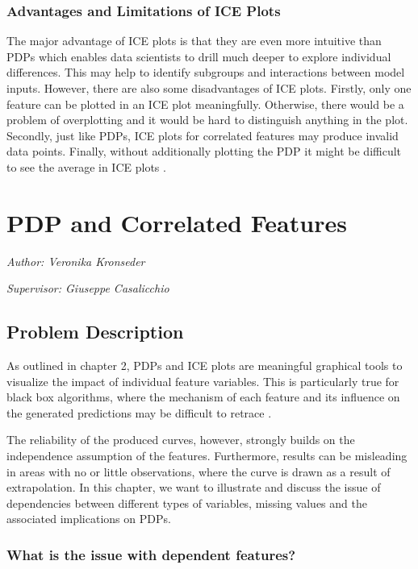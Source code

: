 \documentclass[]{krantz}
\begin{document}
\subsection{Advantages and Limitations of ICE
Plots}\label{advantages-and-limitations-of-ice-plots}

The major advantage of ICE plots is that they are even more intuitive
than PDPs which enables data scientists to drill much deeper to explore
individual differences. This may help to identify subgroups and
interactions between model inputs. However, there are also some
disadvantages of ICE plots. Firstly, only one feature can be plotted in
an ICE plot meaningfully. Otherwise, there would be a problem of
overplotting and it would be hard to distinguish anything in the plot.
Secondly, just like PDPs, ICE plots for correlated features may produce
invalid data points. Finally, without additionally plotting the PDP it
might be difficult to see the average in ICE plots \citep{molnar2019}.

\chapter{PDP and Correlated Features}\label{pdp-correlated}

\emph{Author: Veronika Kronseder}

\emph{Supervisor: Giuseppe Casalicchio}

\section{Problem Description}\label{ProblemDescription}

As outlined in chapter 2, PDPs and ICE plots are meaningful graphical
tools to visualize the impact of individual feature variables. This is
particularly true for black box algorithms, where the mechanism of each
feature and its influence on the generated predictions may be difficult
to retrace \citep{Goldstein2013}.

The reliability of the produced curves, however, strongly builds on the
independence assumption of the features. Furthermore, results can be
misleading in areas with no or little observations, where the curve is
drawn as a result of extrapolation. In this chapter, we want to
illustrate and discuss the issue of dependencies between different types
of variables, missing values and the associated implications on PDPs.

\subsection{What is the issue with dependent
features?}\label{what-is-the-issue-with-dependent-features}
\end{document}

